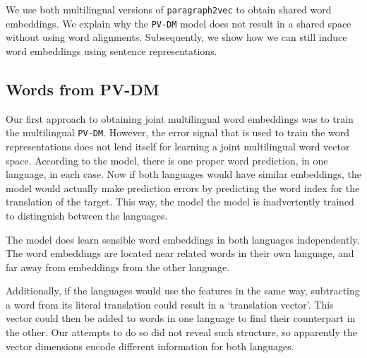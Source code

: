 
% 
% 
We use both multilingual versions of {\tt paragraph2vec} to obtain shared word embeddings. We explain why the {\tt PV-DM} model does not result in a shared space without using word alignments. Subsequently, we show how we can still induce word embeddings using sentence representations.



\subsection{Words from PV-DM}
Our first approach to obtaining joint multilingual word embeddings was to train the multilingual \texttt{PV-DM}.
However, the error signal that is used to train the word representations does not lend itself for learning a joint multilingual word vector space.
According to the model, there is one proper word prediction, in one language, in each case.
Now if both languages would have similar embeddings, the model would actually make prediction errors by predicting the word index for the translation of the target.
This way, the model the model is inadvertently trained to distinguish between the languages.%

The model does learn sensible word embeddings in both languages independently.
The word embeddings are located near related words in their own language, and far away from embeddings from the other language.

Additionally, if the languages would use the features in the same way, subtracting a word from its literal translation could result in a `translation vector'. This vector could then be added to words in one language to find their counterpart in the other.
Our attempts to do so did not reveal such structure, so apparently the vector dimensions encode different information for both languages.



